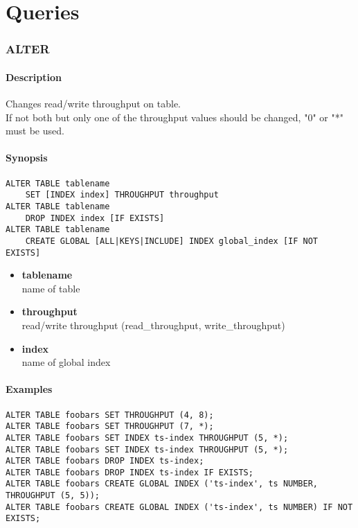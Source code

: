\chapter{Queries}
\label{cha:queries}

\subsection{ALTER}
\subsubsection{Description}
Changes read/write throughput on table.\\
If not both but only one of the throughput values should be changed, "0" or "*" must be used.

\subsubsection{Synopsis}
\lstset{language=Java}
\begin{lstlisting}
ALTER TABLE tablename
    SET [INDEX index] THROUGHPUT throughput
ALTER TABLE tablename
    DROP INDEX index [IF EXISTS]
ALTER TABLE tablename
    CREATE GLOBAL [ALL|KEYS|INCLUDE] INDEX global_index [IF NOT EXISTS]
\end{lstlisting}
\begin{itemize}
	\item \textbf{tablename}\\
	name of table
	\item \textbf{throughput}\\
	read/write throughput (read\_throughput, write\_throughput)
	\item \textbf{index}\\
	name of global index
\end{itemize}

\subsubsection{Examples}
\lstset{language=Java}
\begin{lstlisting}
ALTER TABLE foobars SET THROUGHPUT (4, 8);
ALTER TABLE foobars SET THROUGHPUT (7, *);
ALTER TABLE foobars SET INDEX ts-index THROUGHPUT (5, *);
ALTER TABLE foobars SET INDEX ts-index THROUGHPUT (5, *);
ALTER TABLE foobars DROP INDEX ts-index;
ALTER TABLE foobars DROP INDEX ts-index IF EXISTS;
ALTER TABLE foobars CREATE GLOBAL INDEX ('ts-index', ts NUMBER, THROUGHPUT (5, 5));
ALTER TABLE foobars CREATE GLOBAL INDEX ('ts-index', ts NUMBER) IF NOT EXISTS;
\end{lstlisting}

